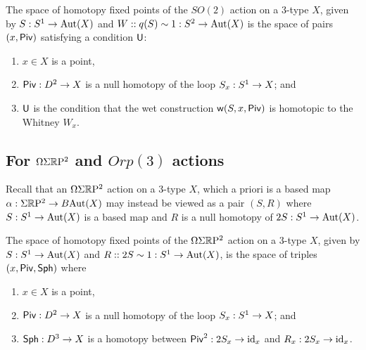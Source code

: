 \documentclass{amsart}
\begin{document}



\begin{proposition}
The space of homotopy fixed points of the $SO(2)$ action on a 3-type $X$, given by $S: S^1 \rightarrow \mathrm{Aut}(X)$ and $W :: q(S) \sim 1 : S^2 \to \mathrm{Aut}(X)$ is the space of pairs $(x,\mathsf{Piv})$ satisfying a condition $\mathsf{U}$:
\begin{enumerate}
\item $x \in X$ is a point,
\item $\mathsf{Piv}: D^2 \rightarrow X$ is a null homotopy of the loop $S_x: S^1 \rightarrow X$; and
\item $\mathsf{U}$ is the condition that the wet construction $\mathsf{w}(S,x,\mathsf{Piv})$ is homotopic to the Whitney $W_x$.
\end{enumerate}
\end{proposition}

\subsection{For $\Omega \Sigma \mathbb R \mathrm{P}^2$ and $Orp(3)$ actions}

Recall that an $\Omega \Sigma \mathbb R \mathrm{P}^2$ action on a 3-type $X$, which a priori is a based map $\alpha: \Sigma \mathbb R \mathrm{P}^2 \rightarrow B\mathrm{Aut}(X)$ may instead be viewed as a pair $(S,R)$ where $S : S^1 \rightarrow \mathrm{Aut}(X)$ is a based map and $R$ is a null homotopy of $2S : S^1 \rightarrow \mathrm{Aut}(X)$.

\begin{proposition}
The space of homotopy fixed points of the $\Omega \Sigma \mathbb R \mathrm{P}^2$ action on a 3-type $X$, given by $S: S^1 \rightarrow \mathrm{Aut}(X)$ and $R:: 2S \sim 1 : S^1 \rightarrow \mathrm{Aut}(X)$, is the space of triples $(x, \mathsf{Piv}, \mathsf{Sph})$ where
\begin{enumerate}
\item $x \in X$ is a point,
\item $\mathsf{Piv}: D^2 \rightarrow X$ is a null homotopy of the loop $S_x: S^1 \rightarrow X$; and
\item $\mathsf{Sph}: D^3 \rightarrow X$ is a homotopy between $\mathsf{Piv}^2 : 2 S_x \rightarrow \mathrm{id}_x$ and $R_x: 2 S_x \rightarrow \mathrm{id}_x$.
\end{enumerate}
\end{proposition}
\end{document}
